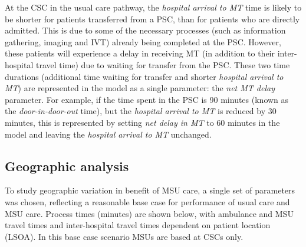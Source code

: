 At the CSC in the usual care pathway, the \emph{hospital arrival to MT} time is likely to be shorter for patients transferred from a PSC, than for patients who are directly admitted. This is due to some of the necessary processes (such as information gathering, imaging and IVT) already being completed at the PSC. However, these patients will experience a delay in receiving MT (in addition to their inter-hospital travel time) due to waiting for transfer from the PSC. These two time durations (additional time waiting for transfer and shorter \emph{hospital arrival to MT}) are represented in the model as a single parameter: the \emph{net MT delay} parameter. For example, if the time spent in the PSC is 90 minutes (known as the \textit{door-in-door-out} time), but the \textit{hospital arrival to MT} is reduced by 30 minutes, this is represented by setting \textit{net delay in MT} to 60 minutes in the model and leaving the \emph{hospital arrival to MT} unchanged.

\subsection{Geographic analysis}

To study geographic variation in benefit of MSU care, a single set of parameters was chosen, reflecting a reasonable base case for performance of usual care and MSU care. Process times (minutes) are shown below, with ambulance and MSU travel times and inter-hospital travel times dependent on patient location (LSOA). In this base case scenario MSUs are based at CSCs only. 

